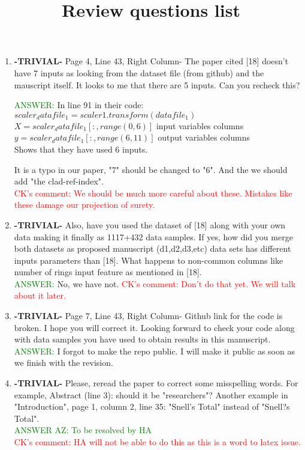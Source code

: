 \documentclass{article}
\title{Review questions list}
\begin{document}
\begin{enumerate}
	\item \textbf{-TRIVIAL-} Page 4, Line 43, Right Column- The paper cited [18] doesn't have 7 inputs as looking from the dataset file (from github) and the mauscript itself. It looks to me that there are 5 inputs. Can you recheck this?

\textcolor{green}{ANSWER: } In line 91 in their code: \\
$ scaler_datafile_1 = scaler1.transform(datafile_1) $  \\
 $X = scaler_datafile_1[:,range(0,6)]$                 input variables columns\\
$y = scaler_datafile_1[:,range(6,11)] $                  output variables columns\\      

Shows that they have used 6 inputs.

It is a typo in our paper, "7" should be changed to "6". And the we should add "the clad-ref-index".	\\
\textcolor{red}{ CK's comment: We should be much more careful about these. Mistakes like these damage our projection of surety.}
	
	\item \textbf{-TRIVIAL-} Also, have you used the dataset of [18] along with your own data making it finally as 1117+432 data samples. If yes, how did you merge both datasets as proposed manuscript (d1,d2,d3,etc) data sets has different inputs parameters than [18]. What happens to non-common columns like number of rings input feature as mentioned in [18].     \\
	\textcolor{green}{ANSWER: } No, we have not. \textcolor{red}{ CK's comment: Don't do that yet. We will talk about it later.}
		
		
\item \textbf{-TRIVIAL-} Page 7, Line 43, Right Column- Github link for the code is broken. I hope you will correct it. Looking forward to check your code along with data samples you have used  to obtain results in this manuscript. \\
\textcolor{green}{ANSWER: } I forgot to make the repo public. I will make it public as soon as we finish with the revision.
    
    \item \textbf{-TRIVIAL-} Please, reread the paper to correct some misspelling words. For example, Abstract (line 3): should it be "researchers"? Another example in "Introduction", page 1, column 2, line 35: "Snell's Total" instead of "Snell?s Total". \\
    \textcolor{green}{ANSWER AZ: To be resolved by HA} \\ \textcolor{red}{ CK's comment: HA will not be able to do this as this is a word to latex issue.}
    

\end{enumerate}
\end{document}
